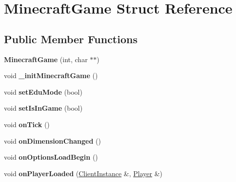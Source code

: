 \hypertarget{struct_minecraft_game}{}\section{Minecraft\+Game Struct Reference}
\label{struct_minecraft_game}
\subsection*{Public Member Functions}
\begin{DoxyCompactItemize}
\item 
\mbox{\label{struct_minecraft_game_acf9b38996adcc3ee4ca340a7027a9c2e}} 
{\bfseries Minecraft\+Game} (int, char $\ast$$\ast$)
\item 
\mbox{\label{struct_minecraft_game_a80871ee5f1ca26e203ccaac786beef6a}} 
void {\bfseries \+\_\+init\+Minecraft\+Game} ()
\item 
\mbox{\label{struct_minecraft_game_a75c79d636e65709e60379486c75413d3}} 
void {\bfseries set\+Edu\+Mode} (bool)
\item 
\mbox{\label{struct_minecraft_game_a28c2d54086e488e34a472955c9353812}} 
void {\bfseries set\+Is\+In\+Game} (bool)
\item 
\mbox{\label{struct_minecraft_game_a546b0a2e073bf592eb82bfa397e0284a}} 
void {\bfseries on\+Tick} ()
\item 
\mbox{\label{struct_minecraft_game_a9f0a5fbbe57d2998e745e23f9f914b11}} 
void {\bfseries on\+Dimension\+Changed} ()
\item 
\mbox{\label{struct_minecraft_game_aac13da48d7e76b315c0d3735d41304ab}} 
void {\bfseries on\+Options\+Load\+Begin} ()
\item 
\mbox{\label{struct_minecraft_game_abe1d8114499b7ee4e0b69093bc09fc62}} 
void {\bfseries on\+Player\+Loaded} (\mbox{\hyperlink{struct_client_instance}{Client\+Instance}} \&, \mbox{\hyperlink{struct_player}{Player}} \&)
\item 
\mbox{\label{struct_minecraft_game_aa1f2015e169985f292ca1ed957bde864}} 
$$
\end{DoxyCompactItemize}
